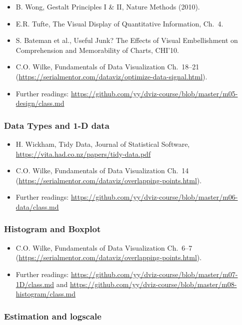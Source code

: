 \begin{itemize}\itemsep0em 
\item B. Wong, Gestalt Principles I \& II, Nature Methods (2010). 
\item E.R. Tufte, The Visual Display of Quantitative Information, Ch.~4.
\item S. Bateman et al., Useful Junk? The Effects of Visual Embellishment on Comprehension and Memorability of Charts, CHI'10.
\item C.O. Wilke, Fundamentals of Data Visualization Ch.~18--21 (\url{https://serialmentor.com/dataviz/optimize-data-signal.html}). 
\item Further readings: \url{https://github.com/yy/dviz-course/blob/master/m05-design/class.md}
\end{itemize}	
\subsubsection{Data Types and 1-D data } %

\begin{itemize}\itemsep0em 
\item H. Wickham, Tidy Data, Journal of Statistical Software, \url{https://vita.had.co.nz/papers/tidy-data.pdf}
\item C.O. Wilke, Fundamentals of Data Visualization Ch.~14 (\url{https://serialmentor.com/dataviz/overlapping-points.html}). 
\item Further readings: \url{https://github.com/yy/dviz-course/blob/master/m06-data/class.md}
\end{itemize}	
\subsubsection{Histogram and Boxplot }%

\begin{itemize}\itemsep0em 
\item C.O. Wilke, Fundamentals of Data Visualization Ch.~6--7 (\url{https://serialmentor.com/dataviz/overlapping-points.html}). 
\item Further readings: \url{https://github.com/yy/dviz-course/blob/master/m07-1D/class.md} and \url{https://github.com/yy/dviz-course/blob/master/m08-histogram/class.md}
\end{itemize}	
\subsubsection{Estimation and logscale }%

